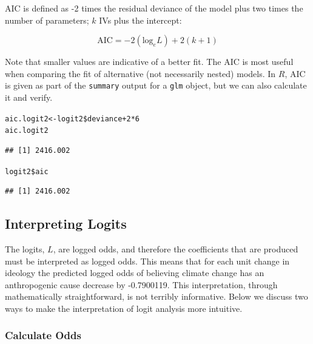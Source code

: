 \documentclass[11pt,openany]{book}\usepackage[]{graphicx}\usepackage[]{color}
\makeatletter
\newcommand{\hlnum}[1]{\textcolor[rgb]{0.686,0.059,0.569}{#1}}%
\newcommand{\hlopt}[1]{\textcolor[rgb]{0,0,0}{#1}}%
\newcommand{\hlstd}[1]{\textcolor[rgb]{0.345,0.345,0.345}{#1}}%
\newcommand{\hlkwb}[1]{\textcolor[rgb]{0.69,0.353,0.396}{#1}}%
\newenvironment{kframe}{%
 \def\at@end@of@kframe{}%
 \ifinner\ifhmode%
  \def\at@end@of@kframe{\end{minipage}}%
  \begin{minipage}{\columnwidth}%
 \fi\fi%
 \def\FrameCommand##1{\hskip\@totalleftmargin \hskip-\fboxsep
 \colorbox{shadecolor}{##1}\hskip-\fboxsep
     \hskip-\linewidth \hskip-\@totalleftmargin \hskip\columnwidth}%
 \MakeFramed {\advance\hsize-\width
   \@totalleftmargin\z@ \linewidth\hsize
   \@setminipage}}%
 {\par\unskip\endMakeFramed%
 \at@end@of@kframe}
\newenvironment{knitrout}{}{} %
\renewenvironment{knitrout}{\begin{singlespace}}{\end{singlespace}}
\makeatother
\begin{document}
AIC is defined as -2 times the residual deviance of the model plus two times the number of parameters; $k$ IVs plus the intercept:

\begin{equation}
  \label{eq:aic}
  \text{AIC} = -2(\text{log}_e L) + 2(k+1) 
\end{equation}

\noindent Note that smaller values are indicative of a better fit. The AIC is most useful when comparing the fit of alternative (not necessarily nested) models. In $R$, AIC is given as part of the \texttt{summary} output for a \texttt{glm} object, but we can also calculate it and verify. 

\begin{knitrout}
\color{fgcolor}\begin{kframe}
\begin{alltt}
\hlstd{aic.logit2} \hlkwb{<-} \hlstd{logit2}\hlopt{\$}\hlstd{deviance} \hlopt{+} \hlnum{2} \hlopt{*} \hlnum{6}
\hlstd{aic.logit2}
\end{alltt}
\begin{verbatim}
## [1] 2416.002
\end{verbatim}
\begin{alltt}
\hlstd{logit2}\hlopt{\$}\hlstd{aic}
\end{alltt}
\begin{verbatim}
## [1] 2416.002
\end{verbatim}
\end{kframe}
\end{knitrout}

\subsection{Interpreting Logits} 

The logits, $L$, are logged odds, and therefore the coefficients that are produced must be interpreted as logged odds. This means that for each unit change in ideology the predicted logged odds of believing climate change has an anthropogenic cause decrease by -0.7900119. This interpretation, through mathematically straightforward, is not terribly informative. Below we discuss two ways to make the interpretation of logit analysis more intuitive.   

\subsubsection{Calculate Odds}
 
\end{document}
